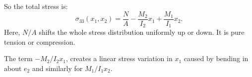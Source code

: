So the total stress is:
\begin{equation*}
  \sigma_{33}(x_1, x_2) = \frac{N}{A} - \frac{M_2}{I_2}x_1 + \frac{M_1}{I_1}x_2
.\end{equation*}
Here, $N / A$ shifts the whole stress distribution uniformly up or down.
It is pure tension or compression.

The term $- M_2 / I_2 x_1$, creates a linear stress variation in $x_1$ caused by bending in about $e_2$ and similarly for $M_1 / I_1 x_2$.
